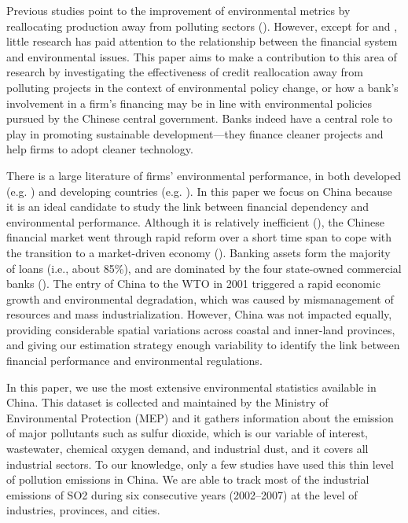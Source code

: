 \documentclass[12pt]{article}
\begin{document}
Previous studies point to the improvement of environmental metrics by reallocating production away from polluting sectors (\cite{Shi2018-zk, Chen2018-ki, Hering2014-af}). However, except for \cite{Andersen2015-pa, Andersen2017-wf} and \cite{Earnhart2012-pk}, little research has paid attention to the relationship between the financial system and environmental issues. This paper aims to make a contribution to this area of research by investigating the effectiveness of credit reallocation away from polluting projects in the context of environmental policy change, or how a bank’s involvement in a firm's financing may be in line with environmental policies pursued by the Chinese central government. Banks indeed have a central role to play in promoting sustainable development—they finance cleaner projects and help firms to adopt cleaner technology.

There is a large literature of firms' environmental performance, in both developed (e.g. \cite{Gray1996-ht, Cole2005-ff, Shadbegian2005-bw, Earnhart2012-pk}) and developing countries (e.g. \cite{Earnhart2006-kb, Cole2008-pj}). In this paper we focus on China because it is an ideal candidate to study the link between financial dependency and environmental performance. Although it is relatively inefficient (\cite{Boyreau-Debray2003-vn, Dollar2007-dr}), the Chinese financial market went through rapid reform over a short time span to cope with the transition to a market-driven economy (\cite{Jarreau2014-lb}). Banking assets form the majority of loans (i.e., about 85\%), and are dominated by the four state-owned commercial banks (\cite{Allen2009-bs}). The entry of China to the WTO in 2001 triggered a rapid economic growth and environmental degradation, which was caused by mismanagement of resources and mass industrialization. However, China was not impacted equally, providing considerable spatial variations across coastal and inner-land provinces, and giving our estimation strategy enough variability to identify the link between financial performance and environmental regulations. 

In this paper, we use the most extensive environmental statistics available in China. This dataset is collected and maintained by the Ministry of Environmental Protection (MEP) and it gathers information about the emission of major pollutants such as sulfur dioxide, which is our variable of interest, wastewater, chemical oxygen demand, and industrial dust, and it covers all industrial sectors. To our knowledge, only a few studies have used this thin level of pollution emissions in China. We are able to track most of the industrial emissions of SO2 during six consecutive years (2002–2007) at the level of industries, provinces, and cities. 
\end{document}
